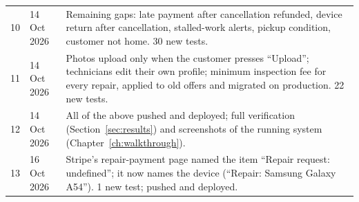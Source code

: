 \documentclass{standalone}
\begin{document}
{\begin{longtable}{@{}p{0.6cm}p{2cm}p{11.4cm}@{}}
10 & 14 Oct 2026 & Remaining gaps: late payment after cancellation refunded, device return after cancellation, stalled-work alerts, pickup condition, customer not home. 30 new tests. \\
11 & 14 Oct 2026 & Photos upload only when the customer presses ``Upload''; technicians edit their own profile; minimum inspection fee for every repair, applied to old offers and migrated on production. 22 new tests. \\
12 & 14 Oct 2026 & All of the above pushed and deployed; full verification (Section~\ref{sec:results}) and screenshots of the running system (Chapter~\ref{ch:walkthrough}). \\
13 & 16 Oct 2026 & Stripe's repair-payment page named the item ``Repair request: undefined''; it now names the device (``Repair: Samsung Galaxy A54''). 1 new test; pushed and deployed. \\
\end{longtable}
}
\end{document}

